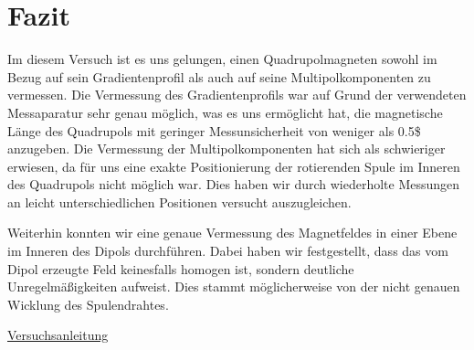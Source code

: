 \documentclass[bigchapter,colorback,accentcolor=tud4b,linedtoc,11pt]{tudreport}
\begin{document}
\chapter{Fazit}
Im diesem Versuch ist es uns gelungen, einen Quadrupolmagneten sowohl im Bezug auf sein Gradientenprofil als auch auf seine Multipolkomponenten zu vermessen. Die Vermessung des Gradientenprofils war auf Grund der verwendeten Messaparatur sehr genau möglich, was es uns ermöglicht hat, die magnetische Länge des Quadrupols mit geringer Messunsicherheit von weniger als 0.5\$ anzugeben. Die Vermessung der Multipolkomponenten hat sich als schwieriger erwiesen, da für uns eine exakte Positionierung der rotierenden Spule im Inneren des Quadrupols nicht möglich war. Dies haben wir durch wiederholte Messungen an leicht unterschiedlichen Positionen versucht auszugleichen.

Weiterhin konnten wir eine genaue Vermessung des Magnetfeldes in einer Ebene im Inneren des Dipols durchführen. Dabei haben wir festgestellt, dass das vom Dipol erzeugte Feld keinesfalls homogen ist, sondern deutliche Unregelmäßigkeiten aufweist. Dies stammt möglicherweise von der nicht genauen Wicklung des Spulendrahtes.

\cleardoublepage{}
\newpage
\begin{thebibliography}{100}
   \url{Versuchsanleitung}
\end{thebibliography}
\end{document}
